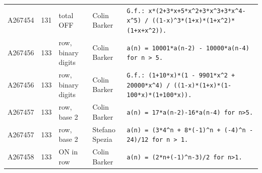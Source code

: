 \documentclass[11pt]{article}
\theoremstyle{definition}
\theoremstyle{remark}
\begin{document}
{\begin{longtable}{p{1.3cm}p{0.7cm}p{2.4cm}p{2.3cm}p{7.3cm}}
A267454 & 131 & total OFF & Colin Barker & \texttt{G.f.: \allowbreak{}x*\allowbreak{}(2+\allowbreak{}3*\allowbreak{}x+\allowbreak{}5*\allowbreak{}x\^{}2+\allowbreak{}3*\allowbreak{}x\^{}3+\allowbreak{}3*\allowbreak{}x\^{}4-\allowbreak{}x\^{}5)\allowbreak{} \allowbreak{}/\allowbreak{} \allowbreak{}((1-\allowbreak{}x)\allowbreak{}\^{}3*\allowbreak{}(1+\allowbreak{}x)\allowbreak{}*\allowbreak{}(1+\allowbreak{}x\^{}2)\allowbreak{}*\allowbreak{}(1+\allowbreak{}x+\allowbreak{}x\^{}2)\allowbreak{})\allowbreak{}.} \\
A267456 & 133 & row, binary digits & Colin Barker & \texttt{a(n)\allowbreak{} \allowbreak{}=\allowbreak{} \allowbreak{}10001*\allowbreak{}a(n-\allowbreak{}2)\allowbreak{} \allowbreak{}-\allowbreak{} \allowbreak{}10000*\allowbreak{}a(n-\allowbreak{}4)\allowbreak{} \allowbreak{}for \allowbreak{}n \allowbreak{}> \allowbreak{}5.} \\
A267456 & 133 & row, binary digits & Colin Barker & \texttt{G.f.: \allowbreak{}(1+\allowbreak{}10*\allowbreak{}x)\allowbreak{}*\allowbreak{}(1 \allowbreak{}-\allowbreak{} \allowbreak{}9901*\allowbreak{}x\^{}2 \allowbreak{}+\allowbreak{} \allowbreak{}20000*\allowbreak{}x\^{}4)\allowbreak{} \allowbreak{}/\allowbreak{} \allowbreak{}((1-\allowbreak{}x)\allowbreak{}*\allowbreak{}(1+\allowbreak{}x)\allowbreak{}*\allowbreak{}(1-\allowbreak{}100*\allowbreak{}x)\allowbreak{}*\allowbreak{}(1+\allowbreak{}100*\allowbreak{}x)\allowbreak{})\allowbreak{}.} \\
A267457 & 133 & row, base 2 & Colin Barker & \texttt{a(n)\allowbreak{} \allowbreak{}=\allowbreak{} \allowbreak{}17*\allowbreak{}a(n-\allowbreak{}2)\allowbreak{}-\allowbreak{}16*\allowbreak{}a(n-\allowbreak{}4)\allowbreak{} \allowbreak{}for \allowbreak{}n>5.} \\
A267457 & 133 & row, base 2 & Stefano Spezia & \texttt{a(n)\allowbreak{} \allowbreak{}=\allowbreak{} \allowbreak{}(3*\allowbreak{}4\^{}n \allowbreak{}+\allowbreak{} \allowbreak{}8*\allowbreak{}(-\allowbreak{}1)\allowbreak{}\^{}n \allowbreak{}+\allowbreak{} \allowbreak{}(-\allowbreak{}4)\allowbreak{}\^{}n \allowbreak{}-\allowbreak{} \allowbreak{}24)\allowbreak{}/\allowbreak{}12 \allowbreak{}for \allowbreak{}n \allowbreak{}> \allowbreak{}1.} \\
A267458 & 133 & ON in row & Colin Barker & \texttt{a(n)\allowbreak{} \allowbreak{}=\allowbreak{} \allowbreak{}(2*\allowbreak{}n+\allowbreak{}(-\allowbreak{}1)\allowbreak{}\^{}n-\allowbreak{}3)\allowbreak{}/\allowbreak{}2 \allowbreak{}for \allowbreak{}n>1.} \\

\end{longtable}}
\end{document}
